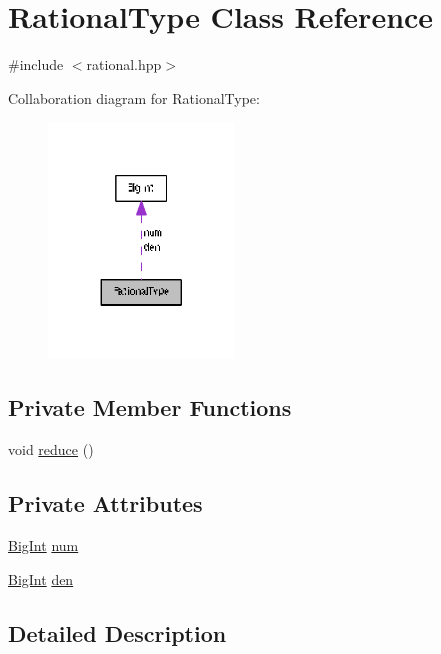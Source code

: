\hypertarget{class_rational_type}{}\section{Rational\+Type Class Reference}
\label{class_rational_type}


{\ttfamily \#include $<$rational.\+hpp$>$}



Collaboration diagram for Rational\+Type\+:
\nopagebreak
\begin{figure}[H]
\begin{center}
\leavevmode
\includegraphics[width=140pt]{class_rational_type__coll__graph}
\end{center}
\end{figure}
\subsection*{Private Member Functions}
\begin{DoxyCompactItemize}
\item 
void \hyperlink{class_rational_type_ab0173d0fb9a0ca208d52cae36adee9bc}{reduce} ()
\end{DoxyCompactItemize}
\subsection*{Private Attributes}
\begin{DoxyCompactItemize}
\item 
\hyperlink{class_big_int}{Big\+Int} \hyperlink{class_rational_type_a58e9bbd85d6b1e294f4c43e0720aab1b}{num}
\item 
\hyperlink{class_big_int}{Big\+Int} \hyperlink{class_rational_type_a627974c03034d239eb30970d30bba030}{den}
\end{DoxyCompactItemize}


\subsection{Detailed Description}


